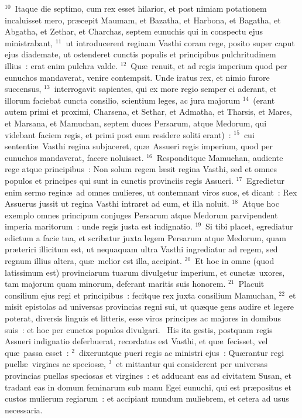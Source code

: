 ${}^{10}$~Itaque die septimo, cum rex esset hilarior, et post nimiam potationem incaluisset mero, pr\ae cepit Maumam, et Bazatha, et Harbona, et Bagatha, et Abgatha, et Zethar, et Charchas, septem eunuchis qui in conspectu ejus ministrabant,
${}^{11}$~ut introducerent reginam Vasthi coram rege, posito super caput ejus diademate, ut ostenderet cunctis populis et principibus pulchritudinem illius~: erat enim pulchra valde.
${}^{12}$~Qu\ae\ renuit, et ad regis imperium quod per eunuchos mandaverat, venire contempsit. Unde iratus rex, et nimio furore succensus,
${}^{13}$~interrogavit sapientes, qui ex more regio semper ei aderant, et illorum faciebat cuncta consilio, scientium leges, ac jura majorum
${}^{14}$~(erant autem primi et proximi, Charsena, et Sethar, et Admatha, et Tharsis, et Mares, et Marsana, et Mamuchan, septem duces Persarum, atque Medorum, qui videbant faciem regis, et primi post eum residere soliti erant)~:
${}^{15}$~cui sententi\ae\ Vasthi regina subjaceret, qu\ae\ Assueri regis imperium, quod per eunuchos mandaverat, facere noluisset.
${}^{16}$~Responditque Mamuchan, audiente rege atque principibus~: Non solum regem l\ae sit regina Vasthi, sed et omnes populos et principes qui sunt in cunctis provinciis regis Assueri.
${}^{17}$~Egredietur enim sermo regin\ae\ ad omnes mulieres, ut contemnant viros suos, et dicant~: Rex Assuerus jussit ut regina Vasthi intraret ad eum, et illa noluit.
${}^{18}$~Atque hoc exemplo omnes principum conjuges Persarum atque Medorum parvipendent imperia maritorum~: unde regis justa est indignatio.
${}^{19}$~Si tibi placet, egrediatur edictum a facie tua, et scribatur juxta legem Persarum atque Medorum, quam pr\ae teriri illicitum est, ut nequaquam ultra Vasthi ingrediatur ad regem, sed regnum illius altera, qu\ae\ melior est illa, accipiat.
${}^{20}$~Et hoc in omne (quod latissimum est) provinciarum tuarum divulgetur imperium, et cunct\ae\ uxores, tam majorum quam minorum, deferant maritis suis honorem.
${}^{21}$~Placuit consilium ejus regi et principibus~: fecitque rex juxta consilium Mamuchan,
${}^{22}$~et misit epistolas ad universas provincias regni sui, ut qu\ae que gens audire et legere poterat, diversis linguis et litteris, esse viros principes ac majores in domibus suis~: et hoc per cunctos populos divulgari.
~His ita gestis, postquam regis Assueri indignatio deferbuerat, recordatus est Vasthi, et qu\ae\ fecisset, vel qu\ae\ passa esset~:
${}^{2}$~dixeruntque pueri regis ac ministri ejus~: Qu\ae rantur regi puell\ae\ virgines ac specios\ae ,
${}^{3}$~et mittantur qui considerent per universas provincias puellas speciosas et virgines~: et adducant eas ad civitatem Susan, et tradant eas in domum feminarum sub manu Egei eunuchi, qui est pr\ae positus et custos mulierum regiarum~: et accipiant mundum muliebrem, et cetera ad usus necessaria.
